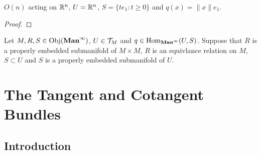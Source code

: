 \documentclass{book}
\begin{document}
\begin{ex} 
	$O(n)$ acting on $\mathbb{R}^n$, $U = \mathbb{R}^n$, $S = \{te_1:t \geq 0\}$ and $q(x) = \|x\|e_1$.
\end{ex}

\begin{proof}
	
\end{proof}



\begin{ex}  
	Let $M, R, S \in \operatorname{Obj}(\operatorname*{\text{\textbf{Man}}^{\infty}})$, $U \in \mathcal{T}_M$ and $q \in \operatorname{Hom}_{\operatorname*{\text{\textbf{Man}}^{\infty}}}(U, S)$. Suppose that $R$ is a properly embedded submanifold of $M \times M$, $R$ is an equivlance relation on $M$, $S \subset U$ and $S$ is a properly embedded submanifold of $U$. 
\end{ex}

























































\newpage
\chapter{The Tangent and Cotangent Bundles}

\section{Introduction}
\end{document}

